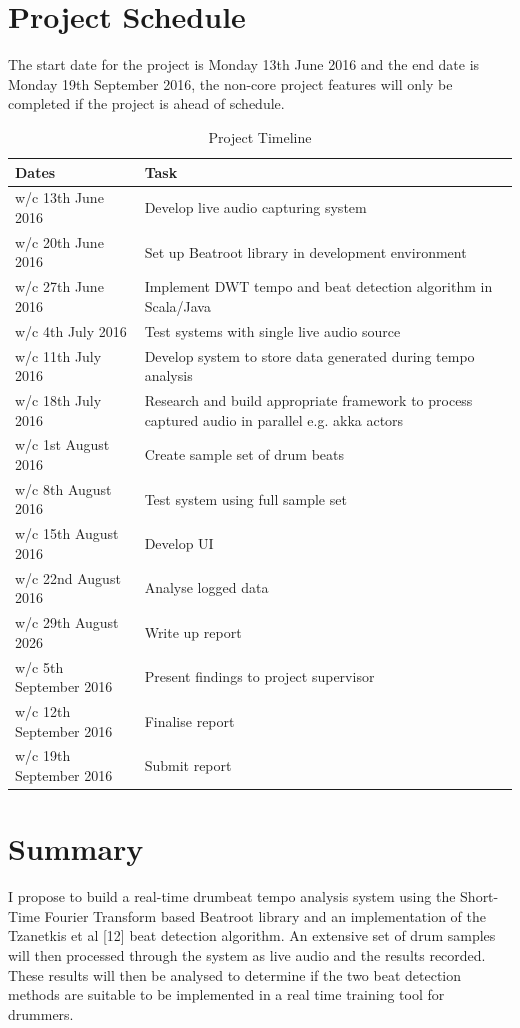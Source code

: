 \documentclass[a4paper, 11pt]{article}
\begin{document}
\section {Project Schedule}
The start date for the project is Monday 13th June 2016 and the end date is Monday 19th September 2016, the non-core project features will only be completed if the project is ahead of schedule.
\begin{table}[h]
\caption{Project Timeline} 
\centering
\begin{tabular}{|p{4cm}|p{8cm}|}
 \hline
\textbf{Dates} & \textbf{Task}\\ [0.5ex]
\hline 
w/c 13th June 2016 & Develop live audio capturing system\\
\hline 
w/c 20th June 2016 & Set up Beatroot library in development environment\\
\hline 
w/c 27th June 2016 & Implement DWT tempo and beat detection algorithm in Scala/Java\\
\hline 
w/c 4th July 2016 & Test systems with single live audio source\\
\hline 
w/c 11th July 2016 & Develop system to store data generated during tempo analysis\\
\hline 
w/c 18th July 2016 & Research and build appropriate framework to process captured audio in parallel e.g. akka actors\\
\hline 
w/c 1st August 2016 & Create sample set of drum beats\\
\hline 
w/c 8th August 2016 & Test system using full sample set\\
\hline 
w/c 15th August 2016 & Develop UI\\
\hline 
w/c 22nd August 2016 & Analyse logged data\\
\hline 
w/c 29th August 2026 & Write up report\\
\hline 
w/c 5th September 2016 & Present findings to project supervisor\\
\hline 
w/c 12th September 2016 & Finalise report\\
\hline 
w/c 19th September 2016 & Submit report\\
\hline
\end{tabular}
\end{table}
\clearpage
\maketitle{} 
\section{Summary}
I propose to build a real-time drumbeat tempo analysis system using the Short-Time Fourier Transform based Beatroot library and an implementation of the Tzanetkis et al [12] beat detection algorithm. An extensive set of drum samples will then processed through the system as live audio and the results recorded. These results will then be analysed to determine if the two beat detection methods are suitable to be implemented in a real time training tool for drummers.
\end{document}
